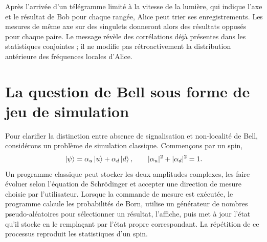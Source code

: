 Après l'arrivée d'un télégramme limité à la vitesse de la lumière, qui indique l'axe et le résultat de Bob pour chaque rangée, Alice peut trier ses enregistrements. Les mesures de même axe sur des singulets donneront alors des résultats opposés pour chaque paire. Le message révèle des corrélations déjà présentes dans les statistiques conjointes ; il ne modifie pas rétroactivement la distribution antérieure des fréquences locales d'Alice.

\begin{classroomqa}
\end{classroomqa}

\begin{classroomqa}
\end{classroomqa}

\section{La question de Bell sous forme de jeu de simulation}

Pour clarifier la distinction entre absence de signalisation et non-localité de Bell, considérons un problème de simulation classique. Commençons par un spin,
\begin{equation}
\left\lvert\psi\right\rangle=\alpha_u\left\lvert u\right\rangle+\alpha_d\left\lvert d\right\rangle,
\qquad
|\alpha_u|^2+|\alpha_d|^2=1.
\end{equation}
Un programme classique peut stocker les deux amplitudes complexes, les faire évoluer selon l'équation de Schr\"odinger et accepter une direction de mesure choisie par l'utilisateur. Lorsque la commande de mesure est exécutée, le programme calcule les probabilités de Born, utilise un générateur de nombres pseudo-aléatoires pour sélectionner un résultat, l'affiche, puis met à jour l'état qu'il stocke en le remplaçant par l'état propre correspondant. La répétition de ce processus reproduit les statistiques d'un spin.

